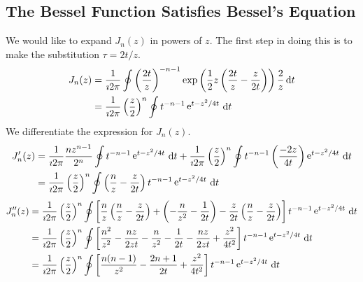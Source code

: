 \subsection{The Bessel Function Satisfies Bessel's Equation}
We would like to expand $J_n(z)$ in powers of $z$.  The first step in doing 
this is to make the substitution $\tau = 2 t / z$.
\begin{align*}
  J_n(z)  
  &= \frac{1}{\imath 2 \pi} \oint \left( \frac{2 t}{z} \right)^{-n-1}
  \exp \left( \frac{1}{2} z \left( \frac{2 t}{z} - \frac{z}{2 t}
    \right) \right) \frac{2}{z}\,\mathrm{d} t 
  \\
  &= \frac{1}{\imath 2 \pi} \left(\frac{z}{2}\right)^n \oint t^{-n-1} \mathop{\mathrm{e}}\nolimits^{t-z^2/4t}\,\mathrm{d} t
\end{align*}
We differentiate the expression for $J_n(z)$.
\begin{align*}
  J_n'(z) 
  &= \frac{1}{\imath 2 \pi} \frac{n z^{n-1}}{2^n} \oint t^{-n-1} \mathop{\mathrm{e}}\nolimits^{t-z^2/4t}\,\mathrm{d} t
  + \frac{1}{\imath 2 \pi} \left(\frac{z}{2}\right)^n \oint t^{-n-1}
  \left(\frac{- 2 z}{4 t} \right) \mathop{\mathrm{e}}\nolimits^{t - z^2 / 4 t}\,\mathrm{d} t 
  \\
  &= \frac{1}{\imath 2 \pi} \left(\frac{z}{2}\right)^n \oint \left( \frac{n}{z}
    - \frac{z}{2 t} \right) t^{-n-1} \mathop{\mathrm{e}}\nolimits^{t - z^2 / 4t}\,\mathrm{d} t 
\end{align*}
\begin{align*}
  J_n''(z)
  &= \frac{1}{\imath 2 \pi} \left(\frac{z}{2}\right)^n \oint \left[
    \frac{n}{z} \left(\frac{n}{z} - \frac{z}{2 t} \right)
    + \left(-\frac{n}{z^2} - \frac{1}{2 t} \right)
    - \frac{z}{2 t} \left(\frac{n}{z} - \frac{z}{2 t} \right) \right]
  t^{-n-1} \mathop{\mathrm{e}}\nolimits^{t - z^2 / 4 t}\,\mathrm{d} t 
  \\
  &= \frac{1}{\imath 2 \pi} \left(\frac{z}{2}\right)^n \oint \left[
    \frac{n^2}{z^2} - \frac{n z}{2 z t} - \frac{n}{z^2} 
    - \frac{1}{2 t} - \frac{n z}{2 z t} + \frac{z^2}{4 t^2} \right]
  t^{-n-1} \mathop{\mathrm{e}}\nolimits^{t - z^2 / 4 t}\,\mathrm{d} t 
  \\
  &= \frac{1}{\imath 2 \pi} \left(\frac{z}{2}\right)^n \oint \left[
    \frac{n (n - 1)}{z^2} - \frac{2 n + 1}{2 t} + \frac{z^2}{4 t^2} \right]
  t^{-n-1} \mathop{\mathrm{e}}\nolimits^{t - z^2 / 4 t}\,\mathrm{d} t
\end{align*}

